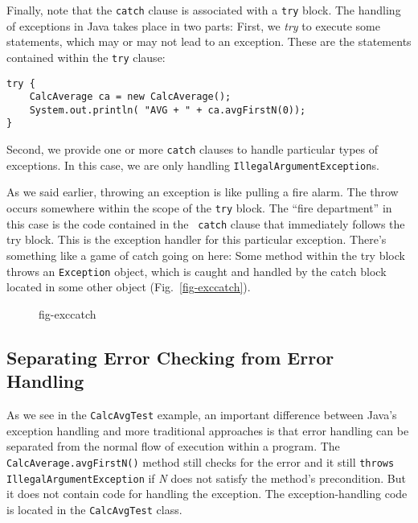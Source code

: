 
\noindent Finally, note that the {\tt catch} clause is associated with a
{\tt try} block.  The handling of exceptions in Java takes place
in two parts: First, we {\it try} to execute some statements,
which may or may not lead to an exception. These are the statements
contained within the {\tt try} clause:

\begin{jjjlisting}
\begin{lstlisting}
try {
    CalcAverage ca = new CalcAverage();
    System.out.println( "AVG + " + ca.avgFirstN(0));        
} 
\end{lstlisting}
\end{jjjlisting}

\noindent Second, we provide one or more {\tt catch} clauses
to handle particular types of exceptions. In this case, we
are only handling {\tt IllegalArgumentException}s.  

As we said earlier, throwing an exception is like pulling a fire alarm.
The throw occurs somewhere within the scope of the {\tt try} block. 
The ``fire department'' in this case is the code contained in the {\tt
catch} clause that immediately follows the try block.  This is the
exception handler for this particular exception. There's something
like a game of catch going on here: Some method within the try block
throws an {\tt Exception} object, which is caught and handled by the
catch block located in some other object (Fig.~\ref{fig-exccatch}).

\begin{figure}[h!]
{fig-exccatch}

\end{figure}

\subsection{Separating Error Checking from Error Handling}
\noindent As we see in the {\tt CalcAvgTest} example, an important difference
between Java's exception handling and
more traditional approaches is that error handling can be separated
from the normal flow of execution within a program. The {\tt
CalcAverage.avgFirstN()} method still checks for the error and
it still {\tt throws} {\tt IllegalArgumentException} if {\it N} does not
satisfy the method's precondition.  But it does not contain code for
handling the exception. The exception-handling code is located in the
{\tt CalcAvgTest} class.

